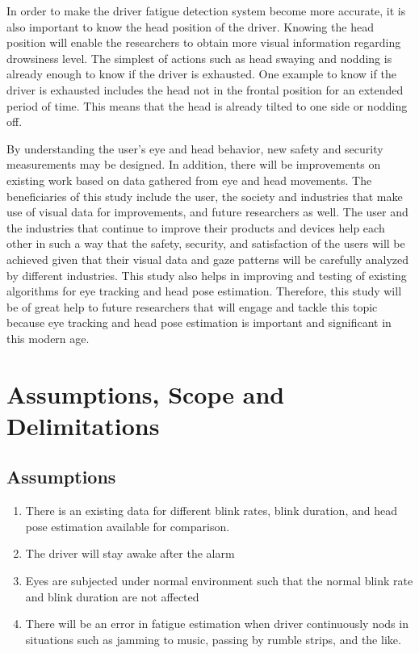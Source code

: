 In order to make the driver fatigue detection system become more accurate, it is also important to know the head position of the driver. Knowing the head position will enable the researchers to obtain more visual information regarding drowsiness level. The simplest of actions such as head swaying and nodding is already enough to know if the driver is exhausted. 
One example to know if the driver is exhausted includes the head not in the frontal position for an extended period of time. This means that the head is already tilted to one side or nodding off.

By understanding the user’s eye and head behavior, new safety and security measurements may be designed. In addition, there will be improvements on existing work based on data gathered from eye and head movements. The beneficiaries of this study include the user, the society and industries that make use of visual data for improvements, and future researchers as well. The user and the industries that continue to improve their products and devices help each other in such a way that the safety, security, and satisfaction of the users will be achieved given that their visual data and gaze patterns will be carefully analyzed by different industries. This study also helps in improving and testing of existing algorithms for eye tracking and head pose estimation. Therefore, this study will be of great help to future researchers that will engage and tackle this topic because eye tracking and head pose estimation is important and significant in this modern age. 




\section{Assumptions, Scope and Delimitations}


\subsection{Assumptions}
\begin{enumerate}
	
	\item There is an existing data for different blink rates, blink duration, and head pose estimation available for comparison.
	
	\item The driver will stay awake after the alarm
	
	\item Eyes are subjected under normal environment such that the normal blink rate and blink duration are not affected
	
	\item There will be an error in fatigue estimation when driver continuously nods in situations such as jamming to music, passing by rumble strips, and the like.
	
\end{enumerate}

